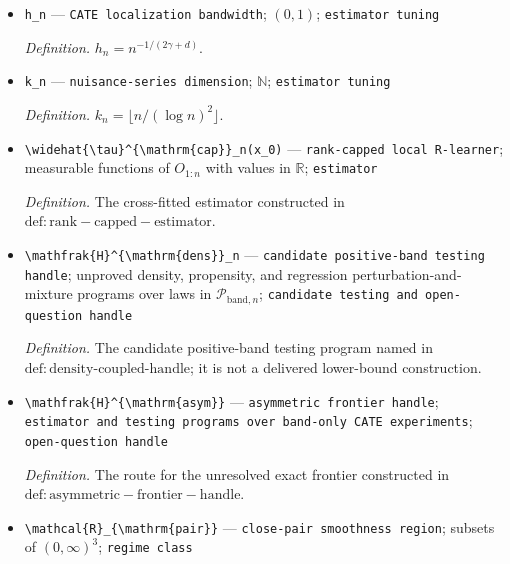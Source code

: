 \documentclass{article}
\begin{document}
\begin{itemize}
  \par\smallskip\noindent\emph{Definition.} The logarithmically inflated upper rate constructed in \(\mathrm{def:band-upper-rate}\).
  \item \texttt{h\_\allowbreak{}n} --- \texttt{CATE localization bandwidth}; \((0,1)\); \texttt{estimator tuning}
  \par\smallskip\noindent\emph{Definition.} \(h_n=n^{-1/(2\gamma+d)}\).
  \item \texttt{k\_\allowbreak{}n} --- \texttt{nuisance-\allowbreak{}series dimension}; \(\mathbb{N}\); \texttt{estimator tuning}
  \par\smallskip\noindent\emph{Definition.} \(k_n=\lfloor n/(\log n)^2\rfloor\).
  \item \texttt{\textbackslash{}\allowbreak{}widehat\{\textbackslash{}\allowbreak{}tau\}\allowbreak{}\textasciicircum{}\{\textbackslash{}\allowbreak{}mathrm\{cap\}\allowbreak{}\}\allowbreak{}\_\allowbreak{}n(x\_\allowbreak{}0)} --- \texttt{rank-\allowbreak{}capped local R-\allowbreak{}learner}; measurable functions of \(O_{1:n}\) with values in \(\mathbb{R}\); \texttt{estimator}
  \par\smallskip\noindent\emph{Definition.} The cross-fitted estimator constructed in \(\mathrm{def:rank-capped-estimator}\).
  \item \texttt{\textbackslash{}\allowbreak{}mathfrak\{H\}\allowbreak{}\textasciicircum{}\{\textbackslash{}\allowbreak{}mathrm\{dens\}\allowbreak{}\}\allowbreak{}\_\allowbreak{}n} --- \texttt{candidate positive-\allowbreak{}band testing handle}; unproved density, propensity, and regression perturbation-and-mixture programs over laws in \(\mathcal{P}_{\mathrm{band},n}\); \texttt{candidate testing and open-\allowbreak{}question handle}
  \par\smallskip\noindent\emph{Definition.} The candidate positive-band testing program named in \(\mathrm{def:density\mbox{-}coupled\mbox{-}handle}\); it is not a delivered lower-bound construction.
  \item \texttt{\textbackslash{}\allowbreak{}mathfrak\{H\}\allowbreak{}\textasciicircum{}\{\textbackslash{}\allowbreak{}mathrm\{asym\}\allowbreak{}\}\allowbreak{}} --- \texttt{asymmetric frontier handle}; \texttt{estimator and testing programs over band-\allowbreak{}only CATE experiments}; \texttt{open-\allowbreak{}question handle}
  \par\smallskip\noindent\emph{Definition.} The route for the unresolved exact frontier constructed in \(\mathrm{def:asymmetric-frontier-handle}\).
  \item \texttt{\textbackslash{}\allowbreak{}mathcal\{R\}\allowbreak{}\_\allowbreak{}\{\textbackslash{}\allowbreak{}mathrm\{pair\}\allowbreak{}\}\allowbreak{}} --- \texttt{close-\allowbreak{}pair smoothness region}; subsets of \((0,\infty)^3\); \texttt{regime class}

\end{itemize}
\end{document}
